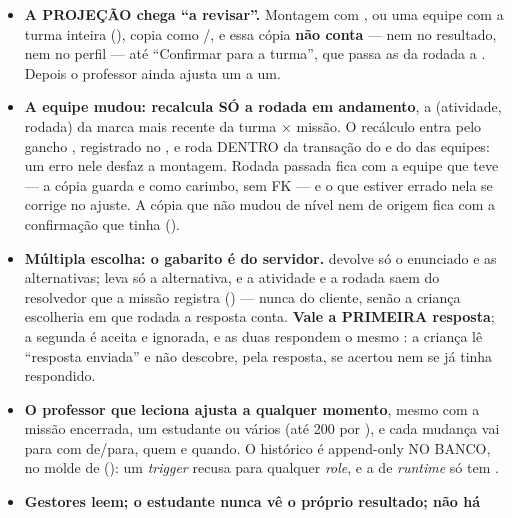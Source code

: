 \begin{itemize}
    (). Colega com marca própria daquela habilidade na rodada,
    ou com ajuste do professor, não é sobrescrito; entre duas fontes da mesma
    equipe, fica a melhor.
  \item \textbf{A PROJEÇÃO chega \enquote{a revisar}.} Montagem com
    , ou uma equipe com a turma inteira (),
    copia como /, e essa cópia \textbf{não conta}
    --- nem no resultado, nem no perfil --- até \enquote{Confirmar para a
    turma}, que passa as da rodada a . Depois o professor ainda
    ajusta um a um.
  \item \textbf{A equipe mudou: recalcula SÓ a rodada em andamento}, a
    (atividade, rodada) da marca mais recente da turma $\times$ missão. O
    recálculo entra pelo gancho , registrado
    no , e roda DENTRO da transação do  e do
     das equipes: um erro nele desfaz a montagem. Rodada passada
    fica com a equipe que teve --- a cópia guarda  e
     como carimbo, sem FK --- e o que estiver errado
    nela se corrige no ajuste. A cópia que não mudou de nível nem de origem fica
    com a confirmação que tinha ().
  \item \textbf{Múltipla escolha: o gabarito é do servidor.}
     devolve só o
    enunciado e as alternativas;  leva só a
    alternativa, e a atividade e a rodada saem do resolvedor que a missão
    registra () --- nunca do cliente, senão a criança
    escolheria em que rodada a resposta conta. \textbf{Vale a PRIMEIRA
    resposta}; a segunda é aceita e ignorada, e as duas respondem o mesmo
    \mbox{}: a criança lê \enquote{resposta enviada} e não
    descobre, pela resposta, se acertou nem se já tinha respondido.
  \item \textbf{O professor que leciona ajusta a qualquer momento}, mesmo com a
    missão encerrada, um estudante ou vários (até 200 por ), e cada
    mudança vai para  com de/para, quem e quando. O
    histórico é append-only NO BANCO, no molde de 
    (): um \emph{trigger} recusa  para qualquer
    \emph{role}, e a de \emph{runtime} só tem .
  \item \textbf{Gestores leem; o estudante nunca vê o próprio resultado; não há
}
\end{itemize}
